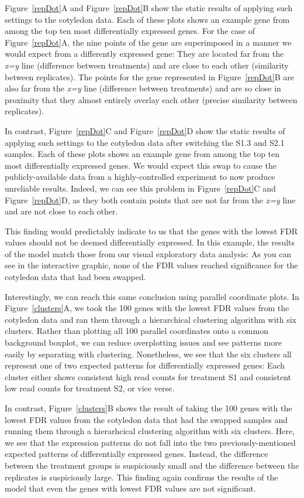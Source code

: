 \documentclass[useAMS,referee]{biom}
\begin{document}
Figure~\ref{repDot}A and Figure~\ref{repDot}B show the static results of applying such settings to the cotyledon data. Each of these plots shows an example gene from among the top ten most differentially expressed genes. For the case of Figure~\ref{repDot}A, the nine points of the gene are superimposed in a manner we would expect from a differently expressed gene: They are located far from the \textit{x=y} line (difference between treatments) and are close to each other (similarity between replicates). The points for the gene represented in Figure~\ref{repDot}B are also far from the \textit{x=y} line (difference between treatments) and are so close in proximity that they almost entirely overlay each other (precise similarity between replicates).

In contrast, Figure~\ref{repDot}C and Figure~\ref{repDot}D show the static results of applying such settings to the cotyledon data after switching the S1.3 and S2.1 samples. Each of these plots shows an example gene from among the top ten most differentially expressed genes. We would expect this swap to cause the publicly-available data from a highly-controlled experiment to now produce unreliable results. Indeed, we can see this problem in Figure~\ref{repDot}C and Figure~\ref{repDot}D, as they both contain points that are not far from the \textit{x=y} line and are not close to each other.

This finding would predictably indicate to us that the genes with the lowest FDR values should not be deemed differentially expressed. In this example, the results of the model match those from our visual exploratory data analysis: As you can see in the interactive graphic, none of the FDR values reached significance for the cotyledon data that had been swapped.

Interestingly, we can reach this same conclusion using parallel coordinate plots. In Figure~\ref{clusters}A, we took the 100 genes with the lowest FDR values from the cotyledon data and ran them through a hierarchical clustering algorithm with six clusters. Rather than plotting all 100 parallel coordinates onto a common background boxplot, we can reduce overplotting issues and see patterns more easily by separating with clustering. Nonetheless, we see that the six clusters all represent one of two expected patterns for differentially expressed genes: Each cluster either shows consistent high read counts for treatment S1 and consistent low read counts for treatment S2, or vice verse.

In contrast, Figure~\ref{clusters}B shows the result of taking the 100 genes with the lowest FDR values from the cotyledon data that had the swapped samples and running them through a hierarhcical clustering algorithm with six clusters. Here, we see that the expression patterns do not fall into the two previously-mentioned expected patterns of differentially expressed genes. Instead, the difference between the treatment groups is suspiciously small and the difference between the replicates is suspiciously large. This finding again confirms the results of the model that even the genes with lowest FDR values are not significant.
\end{document}
